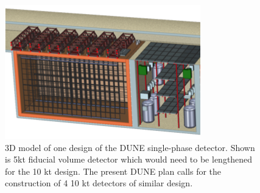 \begin{figure}[!htb]
\centering
\begin{minipage}[b]{1.0\textwidth}
\begin{center}
\includegraphics[width=.75\textwidth]{figures/fardet-3D.png}
\end{center}
\end{minipage}
\caption{\small 3D model of one design of the DUNE single-phase detector. Shown is 5kt fiducial volume detector which would need to be lengthened for the 10 kt design. The present DUNE plan calls for the construction of 4 10 kt detectors of similar design. }
\label{fig:fardet-overview} 
\end{figure}

